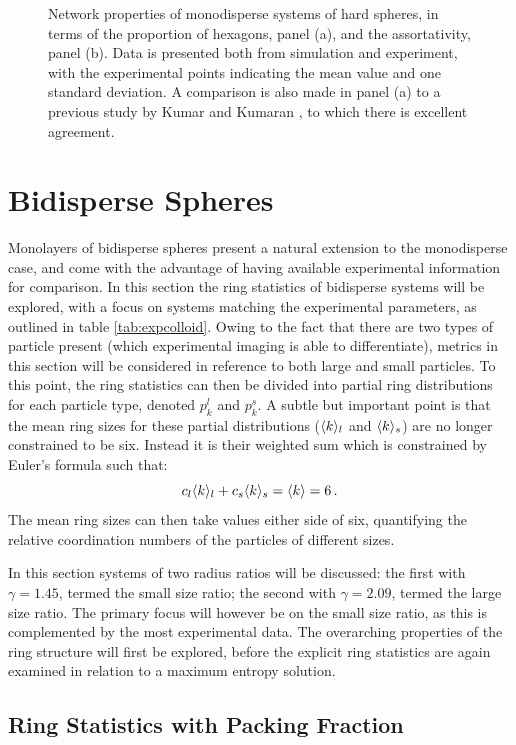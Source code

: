 \begin{figure}[bt]
     \caption{Network properties of monodisperse systems of \qtd{} hard spheres, in terms of the proportion of hexagons, panel (a), and the assortativity, panel (b). Data is presented both from simulation and experiment, with the experimental points indicating the mean value and one standard deviation. A comparison is also made in panel (a) to a previous study by Kumar and Kumaran \cite{Kumar2005}, to which there is excellent agreement.}
     \label{fig:mono}
\end{figure}


\section{Bidisperse Spheres}
\label{s:bidisperse}

Monolayers of bidisperse spheres present a natural extension to the monodisperse case, and come with the advantage of having available experimental information for comparison.
In this section the ring statistics of bidisperse systems will be explored, with a focus on systems matching the experimental parameters, as outlined in table \ref{tab:expcolloid}.
Owing to the fact that there are two types of particle present (which experimental imaging is able to differentiate), metrics in this section will be considered in reference to both large and small particles.
To this point, the ring statistics can then be divided into partial ring distributions for each particle type, denoted $p_k^l$ and $p_k^s$.
A subtle but important point is that the mean ring sizes for these partial distributions ($\langle k \rangle_l$ and $\langle k \rangle_s$) are no longer constrained to be six.
Instead it is their weighted sum which is constrained by Euler's formula such that:
\begin{equation}
	c_l\langle k \rangle_l+c_s\langle k \rangle_s = \langle k \rangle = 6\,.
\end{equation}
The mean ring sizes can then take values either side of six, quantifying the relative coordination numbers of the particles of different sizes.

In this section systems of two radius ratios will be discussed: the first with $\gamma=1.45$, termed the small size ratio; the second with $\gamma=2.09$, termed the large size ratio.
The primary focus will however be on the small size ratio, as this is complemented by the most experimental data.
The overarching properties of the ring structure will first be explored, before the explicit ring statistics are again examined in relation to a maximum entropy solution.


\subsection{Ring Statistics with Packing Fraction}

